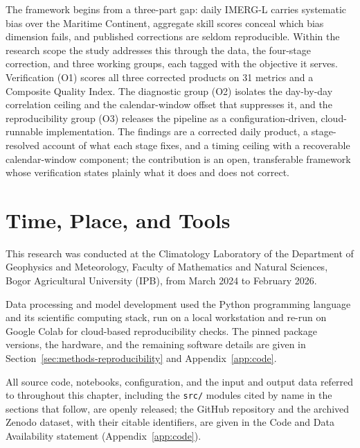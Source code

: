 The framework begins from a three-part gap: daily IMERG-L carries
systematic bias over the Maritime Continent, aggregate skill scores
conceal which bias dimension fails, and published corrections are
seldom reproducible. Within the research scope the study addresses this
through the data, the four-stage correction, and three working groups,
each tagged with the objective it serves. Verification (O1) scores all
three corrected products on 31 metrics and a Composite Quality Index.
The diagnostic group (O2) isolates the day-by-day correlation ceiling
and the calendar-window offset that suppresses it, and the
reproducibility group (O3) releases the pipeline as a
configuration-driven, cloud-runnable implementation. The findings are a
corrected daily product, a stage-resolved account of what each stage
fixes, and a timing ceiling with a recoverable calendar-window
component; the contribution is an open, transferable framework whose
verification states plainly what it does and does not correct.


\section{Time, Place, and Tools}\label{sec:methods-setup}

This research was conducted at the Climatology Laboratory of the
Department of Geophysics and Meteorology, Faculty of Mathematics and
Natural Sciences, Bogor Agricultural University (IPB), from
March 2024 to February 2026.

Data processing and model development used the Python programming
language \citep{ref:vanrossum2009python} and its scientific
computing stack, run on a local workstation and re-run on Google
Colab for cloud-based reproducibility checks. The pinned package
versions, the hardware, and the remaining software details are
given in Section~\ref{sec:methods-reproducibility} and
Appendix~\ref{app:code}.

All source code, notebooks, configuration, and the input and output
data referred to throughout this chapter, including the \texttt{src/}
modules cited by name in the sections that follow, are openly
released; the GitHub repository and the archived Zenodo dataset, with
their citable identifiers, are given in the Code and Data Availability
statement (Appendix~\ref{app:code}).


